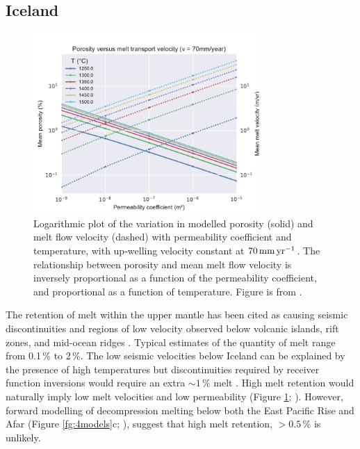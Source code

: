 \subsection{Iceland}

\begin{figure}
\centering
\includegraphics[width=8.6cm]{figures/ch2-phi-vm.pdf}
\caption{Logarithmic plot of the variation in modelled porosity (solid) and melt flow velocity (dashed) with permeability coefficient and temperature, with up-welling velocity constant at $70\rm\,mm\,yr^{-1}$. The relationship between porosity and mean melt flow velocity is inversely proportional as a function of the permeability coefficient, and proportional as a function of temperature. Figure is from \cite{franken-etal-2020}.}
\label{fg:phi-vm}
\end{figure}

The retention of melt within the upper mantle has been cited as causing seismic discontinuities and regions of low velocity observed below volcanic islands, rift zones, and mid-ocean ridges \citep[e.g.][]{forsyth-etal-1998,harmon-etal-2009,rychert-etal-2012,rychert-etal-2014}. Typical estimates of the quantity of melt range from 0.1\,\% to 2\,\%. The low seismic velocities below Iceland can be explained by the presence of high temperatures but discontinuities required by receiver function inversions would require an extra $\sim 1$\,\% melt \citep{rychert-etal-2018}. High melt retention would naturally imply low melt velocities and low permeability (Figure \ref{fg:phi-vm}; \citealp{weatherley-2016,franken-etal-2020}). However, forward modelling of decompression melting below both the East Pacific Rise and Afar (Figure \ref{fg:4models}c; \citealp{goes-etal-2012,armitage-etal-2015}), suggest that high melt retention, $>0.5$\,\% is unlikely. 

